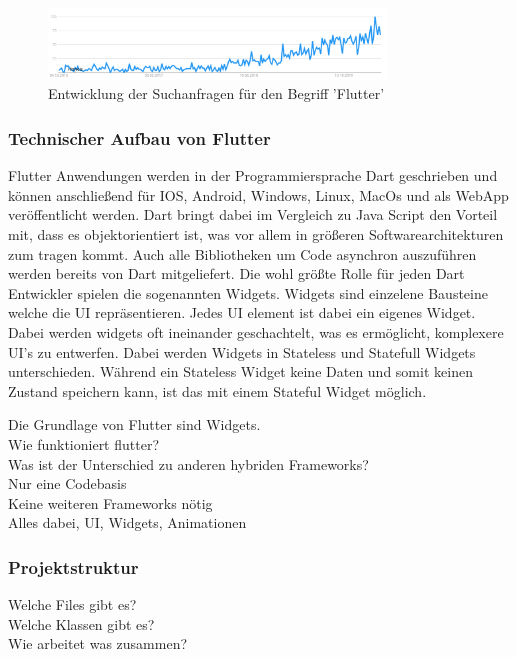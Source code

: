\begin{figure}[h]
 \centering
 \includegraphics[width=0.8\textwidth,angle=0]{abb/flutter_google_trends}
 \caption[Entwicklung von Flutter]{Entwicklung der Suchanfragen für den Begriff 'Flutter'}
\label{fig:flutter_google_trends}
\end{figure}

\subsubsection{Technischer Aufbau von Flutter}
Flutter Anwendungen werden in der Programmiersprache Dart geschrieben und können anschließend für IOS, Android, Windows, Linux, MacOs und als WebApp veröffentlicht werden. Dart bringt dabei im Vergleich zu Java Script den Vorteil mit, dass es objektorientiert ist, was vor allem in größeren Softwarearchitekturen zum tragen kommt. Auch alle Bibliotheken um Code asynchron auszuführen werden bereits von Dart mitgeliefert. 
Die wohl größte Rolle für jeden Dart Entwickler spielen die sogenannten Widgets. Widgets sind einzelene Bausteine welche die UI repräsentieren. Jedes UI element ist dabei ein eigenes Widget. Dabei werden widgets oft ineinander geschachtelt, was es ermöglicht, komplexere UI’s zu entwerfen. Dabei werden Widgets in Stateless und Statefull Widgets unterschieden. Während ein Stateless Widget keine Daten und somit keinen Zustand speichern kann, ist das mit einem Stateful Widget möglich.

Die Grundlage von Flutter sind Widgets. \\
Wie funktioniert flutter?   \\
Was ist der Unterschied zu anderen hybriden Frameworks?  \\ 
Nur eine Codebasis \\
Keine weiteren Frameworks nötig\\
Alles dabei, UI, Widgets, Animationen\\

\subsubsection{Projektstruktur}
Welche Files gibt es? \\
Welche Klassen gibt es? \\
Wie arbeitet was zusammen? \\

